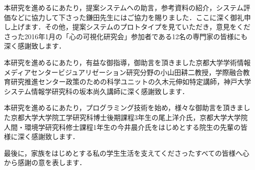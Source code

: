 本研究を進めるにあたり，提案システムへの助言，参考資料の紹介，システム評価などに協力して下さった鎌田先生にはご協力を賜りました．ここに深く御礼申し上げます．その他，提案システムのプロトタイプを見ていただき，意見をくださった2016年1月の「心の可視化研究会」参加者である12名の専門家の皆様にも深く感謝致します．

本研究を進めるにあたり，有益な御指導，御助言を頂きました京都大学学術情報メディアセンタービジュアリゼーション研究分野の小山田耕二教授，学際融合教育研究推進センター政策のための科学ユニットの久木元伸如特定講師，神戸大学 システム情報学研究科の坂本尚久講師に深く感謝致します．

本研究を進めるにあたり，プログラミング技術を始め，様々な御助言を頂きました京都大学大学院工学研究科博士後期課程3年生の尾上洋介氏，京都大学大学院人間・環境学研究科修士課程1年生の今井晨介氏をはじめとする院生の先輩の皆様に深く感謝致します．

最後に，家族をはじめとする私の学生生活を支えてくださったすべての皆様へ心から感謝の意を表します．